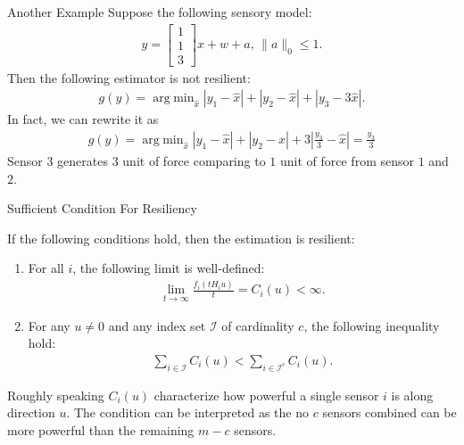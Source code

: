 \documentclass[10pt]{beamer}
\DeclareMathOperator{\argmin}{arg\;min}
\begin{document}
\begin{frame}{Another Example}
  Suppose the following sensory model:
  \begin{align*}
    y = \begin{bmatrix}
      1\\
      1\\
      3
    \end{bmatrix}x + w+a ,\,\|a\|_0\leq 1.
  \end{align*}
  Then the following estimator is not resilient:
  \begin{align*}
    g(y) = \argmin_{\hat x}  |y_1-\hat x|+|y_2-\hat x|+|y_3-3\hat x|.
  \end{align*}
  In fact, we can rewrite it as
  \begin{align*}
    g(y) = \argmin_{\hat x}  |y_1-\hat x|+|y_2-\hat x|+3\left|\frac{y_3}{3}-\hat x\right| = \frac{y_3}{3}
  \end{align*}
  Sensor $3$ generates $3$ unit of force comparing to $1$ unit of force from sensor $1$ and $2$.
\end{frame}

\begin{frame}{Sufficient Condition For Resiliency}
  \begin{theorem}
    If the following conditions hold, then the estimation is resilient:
    \begin{enumerate}
      \item For all $i$, the following limit is well-defined:
	\begin{align*}
	  \lim_{t\rightarrow\infty}\frac{f_i(tH_iu)}{t} = C_i(u) < \infty.
	\end{align*}
      \item For any $u\neq 0$ and any index set $\mathcal I$ of cardinality $c$, the following inequality hold:
	\begin{align*}
	  \sum_{i\in \mathcal I} C_i(u) < \sum_{i\in \mathcal I^c} C_i(u). 
	\end{align*}
    \end{enumerate}
  \end{theorem}
  Roughly speaking $C_i(u)$ characterize how powerful a single sensor $i$ is along direction $u$. The condition can be interpreted as the no $c$ sensors combined can be more powerful than the remaining $m-c$ sensors.
\end{frame}
\end{document}
